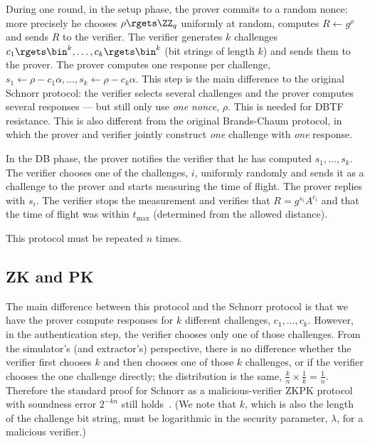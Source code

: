During one round, in the setup phase, the prover commits to a random nonce: 
more precisely he chooses \(\rho\rgets \ZZ_q\) uniformly at random, computes 
\(R\gets g^\rho\) and sends \(R\) to the verifier.
The verifier generates \(k\) challenges \(c_1\rgets \bin^k, \dotsc, c_k\rgets 
  \bin^k\) (bit strings of length \(k\)) and sends them to the prover.
The prover computes one response per challenge, \(s_1\gets \rho - c_1\alpha, 
  \dotsc, s_k\gets \rho - c_k\alpha\).
This step is the main difference to the original Schnorr protocol: the verifier 
selects several challenges and the prover computes several responses --- but 
still only use \emph{one nonce}, \(\rho\).
This is needed for \ac{DBTF} resistance.
This is also different from the original Brands-Chaum protocol, in which the 
prover and verifier jointly construct \emph{one} challenge with \emph{one} 
response.

In the \ac{DB} phase, the prover notifies the verifier that he has computed 
\(s_1, \dotsc, s_k\).
The verifier chooses one of the challenges, \(i\), uniformly randomly and sends 
it as a challenge to the prover and starts measuring the time of flight.
The prover replies with \(s_i\).
The verifier stops the measurement and verifies that \(R = g^{s_i}A^{c_i}\) and 
that the time of flight was within \(t_{\max}\) (determined from the allowed 
  distance).

This protocol must be repeated \(n\) times.

\subsection{\Acl*{ZK} and \acl*{PK}}

The main difference between this protocol and the Schnorr protocol is that we 
have the prover compute responses for \(k\) different challenges, \(c_1, 
  \dotsc, c_k\).
However, in the authentication step, the verifier chooses only one of those 
challenges.
From the simulator's (and extractor's) perspective, there is no difference 
whether the verifier first chooses \(k\) and then chooses one of those \(k\) 
challenges, or if the verifier chooses the one challenge directly;
the distribution is the same, \(\frac{k}{n}\times \frac{1}{k} = \frac{1}{n}\).
Therefore the standard proof for Schnorr as a malicious-verifier \ac{ZKPK} 
protocol with soundness error \(2^{-kn}\) still 
holds~\cite[\eg][]{OnSigmaProtocols}.
(We note that \(k\), which is also the length of the challenge bit string, must 
be logarithmic in the security parameter, \(\lambda\), for a malicious 
verifier.)

